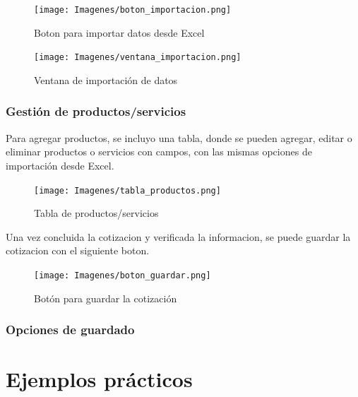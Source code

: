 \documentclass{Pretexto/bluereport}
\begin{document}
\begin{figure}[H]
    \centering
    \texttt{[image: Imagenes/boton\_importacion.png]}
    \caption{Boton para importar datos desde Excel}
    \label{fig:importar_datos}
\end{figure}

\begin{figure}[H]
    \centering
    \texttt{[image: Imagenes/ventana\_importacion.png]}
    \caption{Ventana de importación de datos}
    \label{fig:ventana_importacion}
\end{figure}


\subsubsection{Gestión de productos/servicios}

Para agregar productos, se incluyo una tabla, donde se pueden agregar, editar o eliminar productos o servicios con campos, con las mismas opciones de importación desde Excel.

\begin{figure}[H]
    \centering
    \texttt{[image: Imagenes/tabla\_productos.png]}
    \caption{Tabla de productos/servicios}
    \label{fig:tabla_productos} 
\end{figure}

Una vez concluida la cotizacion y verificada la informacion, se puede guardar la cotizacion con el siguiente boton.

\begin{figure}[H]
    \centering
    \texttt{[image: Imagenes/boton\_guardar.png]}
    \caption{Botón para guardar la cotización}
    \label{fig:boton_guardar}
\end{figure}

\subsubsection{Opciones de guardado}

\section{Ejemplos prácticos}
\end{document}
